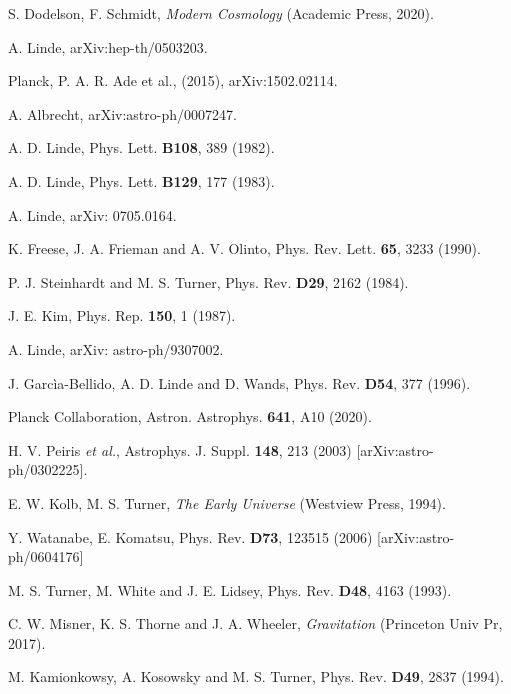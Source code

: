 \documentclass[11pt,a4paper,twoside]{book}
\begin{document}
\begin{thebibliography}{2}
	 S. Dodelson, F. Schmidt, \emph{Modern Cosmology} (Academic Press, 2020).
	
	 A. Linde, arXiv:hep-th/0503203.
	
	 Planck, P. A. R. Ade et al., (2015), arXiv:1502.02114.
	
	 A. Albrecht, arXiv:astro-ph/0007247.
	
	 A. D. Linde, Phys. Lett. \textbf{B108}, 389 (1982).
	
	 A. D. Linde, Phys. Lett. \textbf{B129}, 177  (1983).  
	
	 A. Linde, arXiv: 0705.0164. 
	
	 K. Freese, J. A. Frieman and A. V. Olinto, Phys. Rev. Lett. \textbf{65}, 3233 (1990).
	
	 P. J. Steinhardt and M. S. Turner, Phys. Rev. \textbf{D29}, 2162 (1984).
	
	 J. E. Kim, Phys. Rep. \textbf{150}, 1 (1987).
	
	 A. Linde, arXiv: astro-ph/9307002.
	
	 J. Garcìa-Bellido, A. D. Linde and D. Wands, Phys. Rev. \textbf{D54}, 377 (1996).
	
	 Planck Collaboration, Astron. Astrophys. \textbf{641}, A10 (2020).
	
	 H. V. Peiris \textit{et al.}, Astrophys. J. Suppl. \textbf{148}, 213 (2003) [arXiv:astro-ph/0302225].
	
	 E. W. Kolb, M. S. Turner, \textit{The Early Universe} (Westview Press, 1994).
	
	 Y. Watanabe, E. Komatsu, Phys. Rev. \textbf{D73}, 123515 (2006) [arXiv:astro-ph/0604176]
	
	 M. S. Turner, M. White and J. E. Lidsey, Phys. Rev. \textbf{D48}, 4163 (1993).
	
	 C. W. Misner, K. S. Thorne and J. A. Wheeler, \textit{Gravitation} (Princeton Univ Pr, 2017).
	
	 M. Kamionkowsy, A. Kosowsky and M. S. Turner, Phys. Rev. \textbf{D49}, 2837 (1994).
	

\end{thebibliography}
\end{document}
